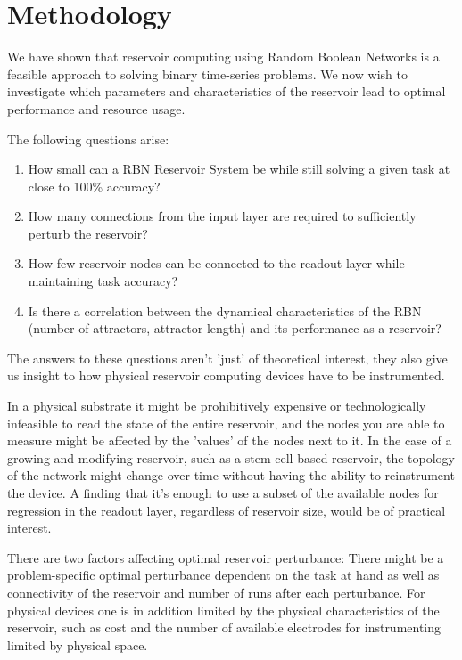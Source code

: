 \chapter{Methodology}
\label{chapter:methodology}


We have shown that reservoir computing using Random Boolean Networks is a feasible approach to solving binary time-series problems.
We now wish to investigate which parameters and characteristics of the reservoir lead to optimal performance and resource usage.

The following questions arise:

\begin{enumerate}
    \item How small can a RBN Reservoir System be while still solving a given task at close to 100\% accuracy?
    \item How many connections from the input layer are required to sufficiently perturb the reservoir?
    \item How few reservoir nodes can be connected to the readout layer while maintaining task accuracy?
    \item Is there a correlation between the dynamical characteristics of the RBN (number of attractors, attractor length) and its performance as a reservoir?
\end{enumerate}

The answers to these questions aren't 'just' of theoretical interest,
they also give us insight to how physical reservoir computing devices have to be instrumented.

In a physical substrate it might be prohibitively expensive or technologically infeasible to read the state of the entire reservoir,
and the nodes you are able to measure might be affected by the 'values' of the nodes next to it.
In the case of a growing and modifying reservoir, such as a stem-cell based reservoir,
the topology of the network might change over time without having the ability to reinstrument the device.
A finding that it's enough to use a subset of the available nodes for regression in the readout layer,
regardless of reservoir size, would be of practical interest.

There are two factors affecting optimal reservoir perturbance:
There might be a problem-specific optimal perturbance dependent on the task at hand as well as connectivity of the reservoir and number of runs after each perturbance.
For physical devices one is in addition limited by the physical characteristics of the reservoir,
such as cost and the number of available electrodes for instrumenting limited by physical space.


